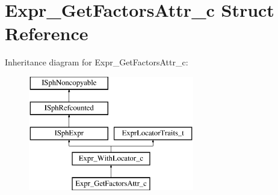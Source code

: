 \hypertarget{structExpr__GetFactorsAttr__c}{\section{Expr\-\_\-\-Get\-Factors\-Attr\-\_\-c Struct Reference}
\label{structExpr__GetFactorsAttr__c}
}
Inheritance diagram for Expr\-\_\-\-Get\-Factors\-Attr\-\_\-c\-:\begin{figure}[H]
\begin{center}
\leavevmode
\includegraphics[height=5.000000cm]{structExpr__GetFactorsAttr__c}
\end{center}
\end{figure}

